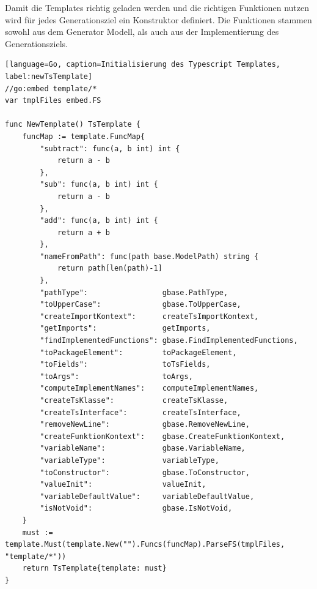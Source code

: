 \documentclass[./einleitung.tex]{subfiles}
\begin{document}
    Damit die Templates richtig geladen werden und die richtigen Funktionen nutzen wird für jedes Generationsziel ein Konstruktor definiert.
    Die Funktionen stammen sowohl aus dem Generator Modell, als auch aus der Implementierung des Generationsziels.
    \begin{lstlisting}[language=Go, caption=Initialisierung des Typescript Templates, label:newTsTemplate]
//go:embed template/*
var tmplFiles embed.FS

func NewTemplate() TsTemplate {
	funcMap := template.FuncMap{
		"subtract": func(a, b int) int {
			return a - b
		},
		"sub": func(a, b int) int {
			return a - b
		},
		"add": func(a, b int) int {
			return a + b
		},
		"nameFromPath": func(path base.ModelPath) string {
			return path[len(path)-1]
		},
		"pathType":                 gbase.PathType,
		"toUpperCase":              gbase.ToUpperCase,
		"createImportKontext":      createTsImportKontext,
		"getImports":               getImports,
		"findImplementedFunctions": gbase.FindImplementedFunctions,
		"toPackageElement":         toPackageElement,
		"toFields":                 toTsFields,
		"toArgs":                   toArgs,
		"computeImplementNames":    computeImplementNames,
		"createTsKlasse":           createTsKlasse,
		"createTsInterface":        createTsInterface,
		"removeNewLine":            gbase.RemoveNewLine,
		"createFunktionKontext":    gbase.CreateFunktionKontext,
		"variableName":             gbase.VariableName,
		"variableType":             variableType,
		"toConstructor":            gbase.ToConstructor,
		"valueInit":                valueInit,
		"variableDefaultValue":     variableDefaultValue,
		"isNotVoid":                gbase.IsNotVoid,
	}
	must := template.Must(template.New("").Funcs(funcMap).ParseFS(tmplFiles, "template/*"))
	return TsTemplate{template: must}
}
    \end{lstlisting}
\end{document}
